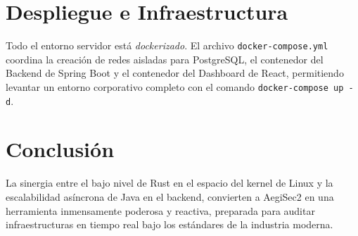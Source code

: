 \documentclass[12pt,a4paper]{article}
\begin{document}
\section{Despliegue e Infraestructura}
Todo el entorno servidor está \textit{dockerizado}. El archivo \texttt{docker-compose.yml} coordina la creación de redes aisladas para PostgreSQL, el contenedor del Backend de Spring Boot y el contenedor del Dashboard de React, permitiendo levantar un entorno corporativo completo con el comando \texttt{docker-compose up -d}.

\section{Conclusión}
La sinergia entre el bajo nivel de Rust en el espacio del kernel de Linux y la escalabilidad asíncrona de Java en el backend, convierten a AegiSec2 en una herramienta inmensamente poderosa y reactiva, preparada para auditar infraestructuras en tiempo real bajo los estándares de la industria moderna.
\end{document}
